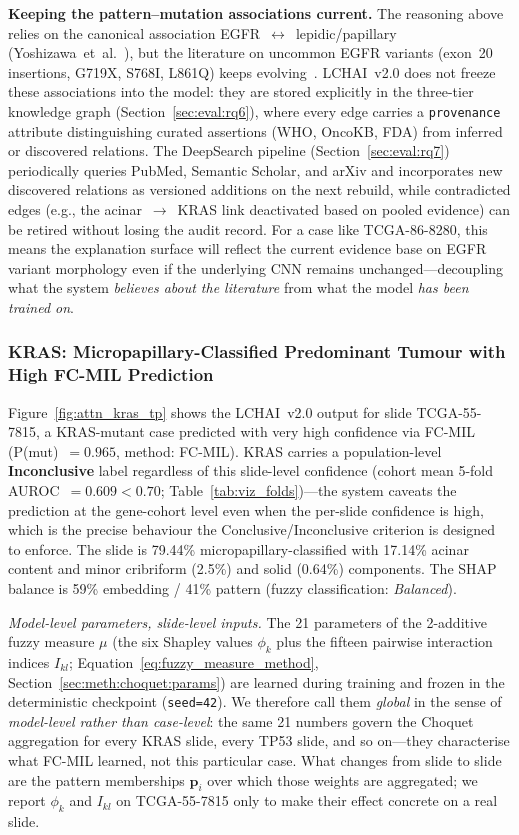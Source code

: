\textbf{Keeping the pattern--mutation associations current.}
The reasoning above relies on the canonical association
EGFR~$\leftrightarrow$~lepidic/papillary
(Yoshizawa~et~al.~\cite{yoshizawa2013egfrmorph}), but the
literature on uncommon EGFR variants (exon~20 insertions, G719X,
S768I, L861Q) keeps evolving~\cite{brindel2020uncommonegfr}.
LCHAI~v2.0 does not freeze these associations into the model: they
are stored explicitly in the three-tier knowledge graph
(Section~\ref{sec:eval:rq6}), where every edge carries a
\texttt{provenance} attribute distinguishing curated assertions
(WHO, OncoKB, FDA) from inferred or discovered relations.
The DeepSearch pipeline (Section~\ref{sec:eval:rq7}) periodically
queries PubMed, Semantic Scholar, and arXiv and incorporates new
discovered relations as versioned additions on the next rebuild,
while contradicted edges (e.g., the acinar~$\to$~KRAS link
deactivated based on pooled evidence) can be retired without losing
the audit record.
For a case like TCGA-86-8280, this means the explanation surface
will reflect the current evidence base on EGFR variant morphology
even if the underlying CNN remains unchanged---decoupling what the
system \emph{believes about the literature} from what the model
\emph{has been trained on}.


\subsubsection{KRAS: Micropapillary-Classified Predominant Tumour with High
FC-MIL Prediction}
\label{sec:eval:tcga:kras}

Figure~\ref{fig:attn_kras_tp} shows the LCHAI~v2.0 output for slide
TCGA-55-7815, a KRAS-mutant case predicted with very high confidence
via FC-MIL (P(mut)~$= 0.965$, method: FC-MIL).
KRAS carries a population-level \textbf{Inconclusive} label regardless
of this slide-level confidence (cohort mean 5-fold
AUROC~$= 0.609 < 0.70$; Table~\ref{tab:viz_folds})---the system
caveats the prediction at the gene-cohort level even when the
per-slide confidence is high, which is the precise behaviour the
Conclusive/Inconclusive criterion is designed to enforce.
The slide is 79.44\% micropapillary-classified with 17.14\% acinar content and minor
cribriform (2.5\%) and solid (0.64\%) components.
The SHAP balance is 59\% embedding / 41\% pattern (fuzzy
classification: \emph{Balanced}).

\emph{Model-level parameters, slide-level inputs.}
The 21 parameters of the 2-additive fuzzy measure $\mu$ (the six
Shapley values $\phi_k$ plus the fifteen pairwise interaction
indices $I_{kl}$;
Equation~\ref{eq:fuzzy_measure_method},
Section~\ref{sec:meth:choquet:params}) are learned during training
and frozen in the deterministic checkpoint (\texttt{seed=42}).
We therefore call them \emph{global} in the sense of
\emph{model-level rather than case-level}: the same 21 numbers
govern the Choquet aggregation for every KRAS slide, every TP53
slide, and so on---they characterise what FC-MIL learned, not this
particular case.
What changes from slide to slide are the pattern memberships
$\mathbf{p}_i$ over which those weights are aggregated; we report
$\phi_k$ and $I_{kl}$ on TCGA-55-7815 only to make their effect
concrete on a real slide.


